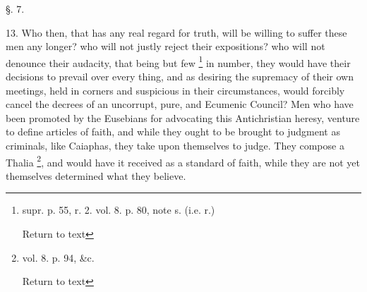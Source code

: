 §. 7.

13. Who then, that has any real regard for truth,
will be willing to suffer these men any longer? who will not justly
reject their expositions? who will not denounce their audacity, that
being but few \footnote{supr. p. 55, r. 2. vol. 8. p. 80, note s. (i.e. r.)

Return to text} in
number, they would have their decisions to prevail over every
thing, and as desiring the supremacy of their own meetings, held in
corners and suspicious in their circumstances, would forcibly cancel
the decrees of an uncorrupt, pure, and Ecumenic Council? Men who have
been promoted by the Eusebians for advocating this Antichristian
heresy, venture to define articles of faith, and while they ought to
be brought to judgment as criminals, like Caiaphas, they take upon
themselves to judge. They compose a Thalia \footnote{vol. 8. p. 94, \&c.

Return to text}, and would have it received as a standard of faith, while they
are not yet themselves determined what they believe.


